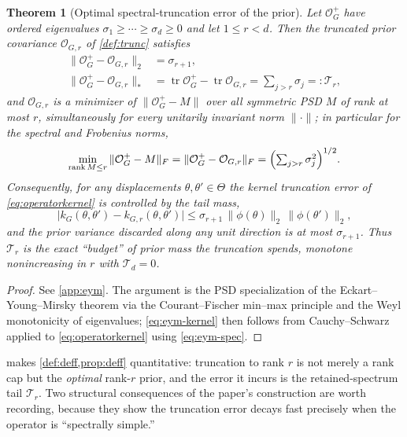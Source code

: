 \documentclass[aps,prxquantum,reprint,amsmath,amssymb,floatfix,nofootinbib,superscriptaddress,longbibliography]{revtex4-2}
\newtheorem{theorem}{Theorem}
\theoremstyle{remark}
\newcommand{\calO}{\mathcal{O}}
\begin{document}
\begin{theorem}[Optimal spectral-truncation error of the prior]
\label{thm:eym}
Let \(\calO_G^{+}\) have ordered eigenvalues \(\sigma_1\ge\cdots\ge\sigma_d\ge0\)
and let \(1\le r<d\).  Then the truncated prior covariance \(\calO_{G,r}\) of
\cref{def:trunc} satisfies
\begin{align}
    \|\calO_G^{+}-\calO_{G,r}\|_2 &= \sigma_{r+1},
    \label{eq:eym-spec}\\
    \|\calO_G^{+}-\calO_{G,r}\|_{*}
        &=\operatorname{tr}\calO_G^{+}-\operatorname{tr}\calO_{G,r}
        =\sum_{j>r}\sigma_j
        =: \mathcal T_r,
    \label{eq:eym-trace}
\end{align}
and \(\calO_{G,r}\) is a \emph{minimizer} of
\(\|\calO_G^{+}-M\|\) over all symmetric PSD \(M\) of rank at most \(r\),
simultaneously for every unitarily invariant norm \(\|\cdot\|\); in particular
for the spectral and Frobenius norms,
\begin{equation}
    \min_{\operatorname{rank}M\le r}\|\calO_G^{+}-M\|_F
    =\|\calO_G^{+}-\calO_{G,r}\|_F
    =\Bigl(\textstyle\sum_{j>r}\sigma_j^{2}\Bigr)^{1/2}.
    \label{eq:eym-fro}
\end{equation}
Consequently, for any displacements \(\theta,\theta'\in\Theta\) the kernel
truncation error of \cref{eq:operatorkernel} is controlled by the tail mass,
\begin{equation}
    \bigl|k_G(\theta,\theta')-k_{G,r}(\theta,\theta')\bigr|
    \le \sigma_{r+1}\,\|\phi(\theta)\|_2\,\|\phi(\theta')\|_2,
    \label{eq:eym-kernel}
\end{equation}
and the prior variance discarded along any unit direction is at most
\(\sigma_{r+1}\).  Thus \(\mathcal T_r\) is the exact ``budget'' of prior mass the
truncation spends, monotone nonincreasing in \(r\) with \(\mathcal T_d=0\).
\end{theorem}

\begin{proof}
See \cref{app:eym}. The argument is the PSD specialization of the
Eckart--Young--Mirsky theorem via the Courant--Fischer min--max principle and the
Weyl monotonicity of eigenvalues; \cref{eq:eym-kernel} then follows from
Cauchy--Schwarz applied to \cref{eq:operatorkernel} using \cref{eq:eym-spec}.
\end{proof}

 makes \cref{def:deff,prop:deff} quantitative: truncation to rank
\(r\) is not merely a rank cap but the \emph{optimal} rank-\(r\) prior, and the
error it incurs is the retained-spectrum tail \(\mathcal T_r\).  Two structural
consequences of the paper's construction are worth recording, because they show
the truncation error decays fast precisely when the operator is
``spectrally simple.''
\end{document}
